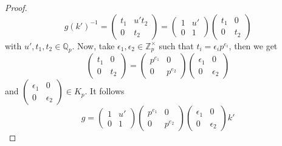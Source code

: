 \documentclass[a4paper, 12pt]{article}
\theoremstyle{Mydefinition}
\theoremstyle{Mytheorem}
\begin{document}
\begin{enumerate}
\begin{proof}
    \begin{equation}
        g(k')^{-1} = \begin{pmatrix}
            t_1 & u't_2\\
            0 & t_2
        \end{pmatrix}
        =\begin{pmatrix}
            1 & u'\\
            0 & 1
        \end{pmatrix}\begin{pmatrix}
            t_1 & 0\\
            0 & t_2
        \end{pmatrix}
    \end{equation}
    with $u',t_1,t_2\in\mathbb{Q}_p$. Now, take $\epsilon_1,\epsilon_2\in\mathbb{Z}_p^\times$ such that $t_i = \epsilon_i p^{e_i}$, then we get
    \begin{equation}
        \begin{pmatrix}
            t_1 & 0\\
            0 & t_2
        \end{pmatrix} = \begin{pmatrix}
            p^{e_1} & 0\\
            0 & p^{e_2}
        \end{pmatrix}\begin{pmatrix}
            \epsilon_1 & 0\\
            0 & \epsilon_2
        \end{pmatrix}
    \end{equation}
    and $\begin{pmatrix}
            \epsilon_1 & 0\\
            0 & \epsilon_2
        \end{pmatrix}\in K_p$. It follows
        \begin{equation}
            g = \begin{pmatrix}
            1 & u'\\
            0 & 1
        \end{pmatrix}\begin{pmatrix}
            p^{e_1} & 0\\
            0 & p^{e_2}
        \end{pmatrix}\begin{pmatrix}
            \epsilon_1 & 0\\
            0 & \epsilon_2
        \end{pmatrix}k'
        \end{equation}
        

\end{proof}
\end{enumerate}
\end{document}
